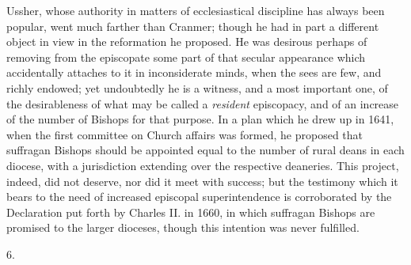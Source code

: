 Ussher, whose authority in matters of
ecclesiastical discipline has always been popular, went much farther
than Cranmer; though he had in part a different object in view in the
reformation he proposed. He was desirous perhaps of removing from
the episcopate some part of that secular appearance which accidentally
attaches to it in inconsiderate minds, when the sees are few, and
richly endowed; yet undoubtedly he is a witness, and a most important
one, of the desirableness of what may be called a \emph{resident}
episcopacy, and of an increase of the number of Bishops for that
purpose. In a plan which he drew up in 1641, when the first committee
on Church affairs was formed, he proposed that suffragan Bishops
should be appointed equal to the number of rural deans in each
diocese, with a jurisdiction extending over the respective deaneries.
This project, indeed, did not deserve, nor did it meet with success;
but the testimony which it bears to the need of increased episcopal
superintendence is corroborated by the Declaration put forth by
Charles II. in 1660, in which suffragan Bishops are promised to the
larger dioceses, though this intention was never fulfilled.

6.

